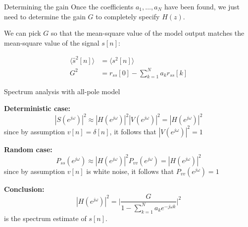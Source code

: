 \documentclass[10pt]{beamer}
\begin{document}
\begin{frame}{Determining the gain}
	Once the coefficients $a_1, \ldots, a_N$ have been found, we just need to determine the gain $G$ to completely specify $H(z)$.
	
	\vspace{0.5cm}
	We can pick $G$ so that the mean-square value of the model output matches the mean-square value of the signal $s[n]$:
	
	\begin{align*}
		\langle \hat{s}^2[n] \rangle &= \langle s^2[n] \rangle \\
		G^2 &= r_{ss}[0] - \sum_{k =1}^N a_kr_{ss}[k] \tag{after some algebra}
	\end{align*}
\end{frame}

\begin{frame}{Spectrum analysis with all-pole model}
	
	\textbf{Deterministic case:}
	\begin{equation*}
		|S(e^{j\omega})|^2 \approx |H(e^{j\omega})|^2|V(e^{j\omega})|^2 = |H(e^{j\omega})|^2
	\end{equation*}
	since by assumption $v[n] = \delta[n]$, it follows that $|V(e^{j\omega})|^2 = 1$
	
	\vspace{0.5cm}
	\textbf{Random case:}
	\begin{equation*}
	P_{ss}(e^{j\omega}) \approx |H(e^{j\omega})|^2P_{vv}(e^{j\omega}) = |H(e^{j\omega})|^2
	\end{equation*}
	since by assumption $v[n]$ is white noise, it follows that $P_{vv}(e^{j\omega}) = 1$
		
	\vspace{0.5cm}
	\textbf{Conclusion:}
	\begin{equation*}
		|H(e^{j\omega})|^2 = \bigg|\frac{G}{1 - \sum_{k =1}^Na_ke^{-j\omega k}}\bigg|^2
	\end{equation*}
	is the spectrum estimate of $s[n]$.
\end{frame}
\end{document}
